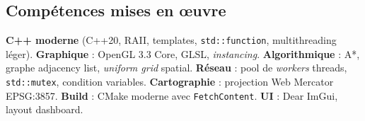 \documentclass[a4paper,11pt]{article}
\begin{document}
\subsection{Comp\'etences mises en \oe uvre}

\textbf{C++ moderne} (C++20, RAII, templates, \texttt{std::function},
multithreading l\'eger). \textbf{Graphique} : OpenGL 3.3 Core, GLSL,
\emph{instancing}. \textbf{Algorithmique} : A*, graphe adjacency list,
\emph{uniform grid} spatial. \textbf{R\'eseau} : pool de \textit{workers}
threads, \texttt{std::mutex}, condition variables. \textbf{Cartographie} :
projection Web Mercator EPSG:3857. \textbf{Build} : CMake moderne avec
\texttt{FetchContent}. \textbf{UI} : Dear ImGui, layout dashboard.
\end{document}
